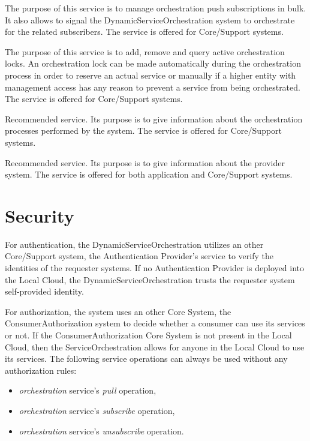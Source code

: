 \documentclass[a4paper]{arrowhead}
\begin{document}
The purpose of this service is to manage orchestration push subscriptions in bulk. It also allows to signal the DynamicServiceOrchestration system to orchestrate for the related subscribers. The service is offered for Core/Support systems. 

The purpose of this service is to add, remove and query active orchestration locks. An orchestration lock can be made automatically during the orchestration process in order to reserve an actual service or manually if a higher entity with management access has any reason to prevent a service from being orchestrated. The service is offered for Core/Support systems.

Recommended service. Its purpose is to give information about the orchestration processes performed by the system. The service is offered for Core/Support systems.

Recommended service. Its purpose is to give information about the provider system. The service is offered for both application and Core/Support systems. 

\newpage

\section{Security}
\label{sec:security}

For authentication, the DynamicServiceOrchestration utilizes an other Core/Support system, the Authentication Provider's service to verify the identities of the requester systems. If no Authentication Provider is deployed into the Local Cloud, the DynamicServiceOrchestration trusts the requester system self-provided identity.

For authorization, the system uses an other Core System, the ConsumerAuthorization system to decide whether a consumer can use its services or not. If the ConsumerAuthorization Core System is not present in the Local Cloud, then the ServiceOrchestration allows for anyone in the Local Cloud to use its services. The following service operations can always be used without any authorization rules:

\begin{itemize}
    \item \textit{orchestration} service's \textit{pull} operation,
    \item \textit{orchestration} service's \textit{subscribe} operation,
    \item \textit{orchestration} service's \textit{unsubscribe} operation.
\end{itemize}
\end{document}
